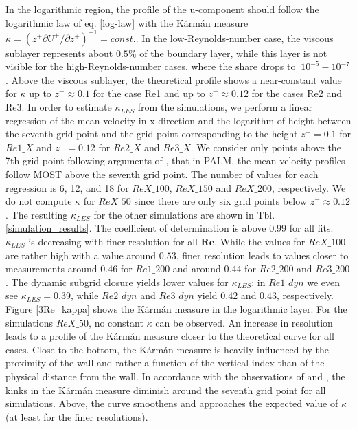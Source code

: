 \documentclass[a4paper,11pt]{article}
\newcommand{\RE}{\mathbf{Re}}
\begin{document}
In the logarithmic region, the profile of the u-component should follow the logarithmic law of eq. \ref{log-law} with the K\'arm\'an measure $\kappa = (z^+\partial U^+/\partial z^+)^{-1}=const.$. In the low-Reynolds-number case, the viscous sublayer represents about $0.5\%$ of the boundary layer, while this layer is not visible for the high-Reynolds-number cases, where the share drops to $~10^{-5}-10^{-7}$. Above the viscous sublayer, the theoretical profile shows a near-constant value for $\kappa$ up to $z^-\approx0.1$ for the case Re1 and up to $z^-\approx0.12$ for the cases Re2 and Re3. In order to estimate $\kappa_{LES}$ from the simulations, we perform a linear regression of the mean velocity in x-direction and the logarithm of height between the seventh grid point and the grid point corresponding to the height $z^-=0.1$ for $Re1\_X$ and $z^-=0.12$ for $Re2\_X$ and $Re3\_X$. We consider only points above the 7th grid point following arguments of \cite{maronga2020improved}, that in PALM, the mean velocity profiles follow MOST above the seventh grid point. The number of values for each regression is 6, 12, and 18 for $ReX\_100$, $ReX\_150$ and $ReX\_200$, respectively.  We do not compute $\kappa$ for $ReX\_50$ since there are only six grid points below $z^-\approx 0.12$. The resulting $\kappa_{LES}$ for the other simulations are shown in Tbl. \ref{simulation_results}. The coefficient of determination is above 0.99 for all fits. $\kappa_{LES}$ is decreasing with finer resolution for all $\RE$. While the values for $ReX\_100$ are rather high with a value around $0.53$, finer resolution leads to values closer to measurements around $0.46$ for $Re1\_200$ and around $0.44$ for $Re2\_200$ and $Re3\_200$. The dynamic subgrid closure yields lower values for $\kappa_{LES}$: in $Re1\_dyn$ we even see $\kappa_{LES}=0.39$, while $Re2\_dyn$ and $Re3\_dyn$ yield $0.42$ and $0.43$, respectively. Figure \ref{3Re_kappa} shows the K\'arm\'an measure in the logarithmic layer. For the simulations $ReX\_50$, no constant $\kappa$ can be observed. An increase in resolution leads to a profile of the K\'arm\'an measure closer to the theoretical curve for all cases. Close to the bottom, the K\'arm\'an measure is heavily influenced by the proximity of the wall and rather a function of the vertical index than of the physical distance from the wall. In accordance with the observations of \cite{maronga2014monin} and \cite{maronga2017formulation}, the kinks in the K\'arm\'an measure diminish around the seventh grid point for all simulations. Above, the curve smoothens and approaches the expected value of $\kappa$ (at least for the finer resolutions).  
\end{document}
